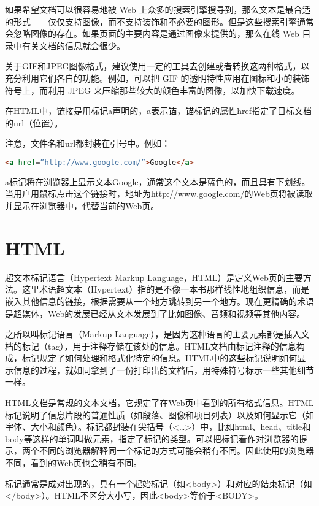 如果希望文档可以很容易地被 Web 上众多的搜索引擎搜寻到，那么文本是最合适的形式——仅仅支持图像，而不支持装饰和不必要的图形。但是这些搜索引擎通常会忽略图像的存在。如果页面的主要内容是通过图像来提供的，那么在线 Web 目录中有关文档的信息就会很少。

关于GIF和JPEG图像格式，建议使用一定的工具去创建或者转换这两种格式，以充分利用它们各自的功能。例如，可以把 GIF 的透明特性应用在图标和小的装饰符号上，而利用 JPEG 来压缩那些较大的颜色丰富的图像，以加快下载速度。



在HTML中，链接是用标记a声明的，a表示锚，锚标记的属性href指定了目标文档的url（位置）。

注意，文件名和url都封装在引号中。例如：

\begin{lstlisting}[language=HTML]
<a href=”http://www.google.com/”>Google</a>
\end{lstlisting}

a标记将在浏览器上显示文本Google，通常这个文本是蓝色的，而且具有下划线。当用户用鼠标点击这个链接时，地址为http://www.google.com/的Web页将被读取并显示在浏览器中，代替当前的Web页。




\section{HTML}



超文本标记语言（Hypertext Markup Language，HTML）是定义Web页的主要方法。这里术语超文本（Hypertext）指的是不像一本书那样线性地组织信息，而是嵌入其他信息的链接，根据需要从一个地方跳转到另一个地方。现在更精确的术语是超媒体，Web的发展已经从文本发展到了比如图像、音频和视频等其他内容。

之所以叫标记语言（Markup Language），是因为这种语言的主要元素都是插入文档的标记（tag），用于注释存储在该处的信息。HTML文档由标记注释的信息构成，标记规定了如何处理和格式化特定的信息。HTML中的这些标记说明如何显示信息的过程，就如同拿到了一份打印出的文档后，用特殊符号标示一些其他细节一样。


HTML文档是常规的文本文档，它规定了在Web页中看到的所有格式信息。HTML标记说明了信息片段的普通性质（如段落、图像和项目列表）以及如何显示它（如字体、大小和颜色）。标记都封装在尖括号（<…>）中，比如html、head、title和body等这样的单词叫做元素，指定了标记的类型。可以把标记看作对浏览器的提示，两个不同的浏览器解释同一个标记的方式可能会稍有不同。因此使用的浏览器不同，看到的Web页也会稍有不同。

标记通常是成对出现的，具有一个起始标记（如<body>）和对应的结束标记（如</body>）。HTML不区分大小写，因此<body>等价于<BODY>。

